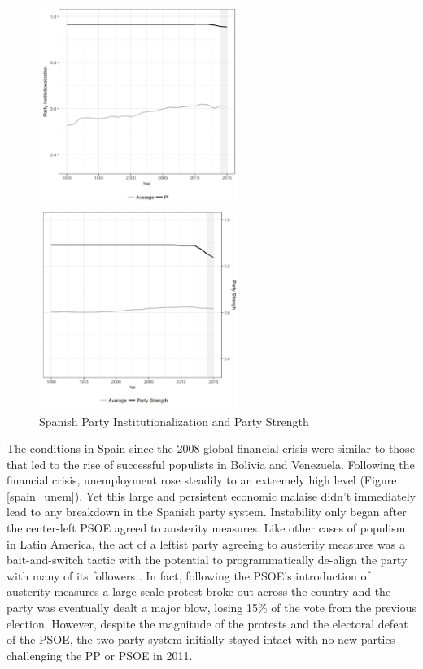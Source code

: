 \documentclass[a4paper,12pt]{article}\usepackage[]{graphicx}\usepackage[]{color}
\begin{document}
\begin{figure}%
\centering
\parbox{2.5in}{\includegraphics[width=65mm, height=65mm]{spain1.jpg}}%
\qquad
\begin{minipage}{2in}%
\includegraphics[width=65mm, height=65mm]{spain2.jpg}
\end{minipage}%
\caption{Spanish Party Institutionalization and Party Strength}%
\label{spainpsi}%
\end{figure}
\par
The conditions in Spain since the 2008 global financial crisis were similar to those that led to the rise of successful populists in Bolivia and Venezuela. Following the financial crisis, unemployment rose steadily to an extremely high level (Figure \ref{spain_unem}). Yet this large and persistent economic malaise didn't immediately lead to any breakdown in the Spanish party system. Instability only began after the center-left PSOE agreed to austerity measures. Like other cases of populism in Latin America, the act of a leftist party agreeing to austerity measures was a bait-and-switch tactic with the potential to programmatically de-align the party with many of its followers \citep{roberts2013market}. In fact, following the PSOE's introduction of austerity measures a large-scale protest broke out across the country and the party was eventually dealt a major blow, losing 15\% of the vote from the previous election. However, despite the magnitude of the protests and the electoral defeat of the PSOE, the two-party system initially stayed intact with no new parties challenging the PP or PSOE in 2011. 
\end{document}

